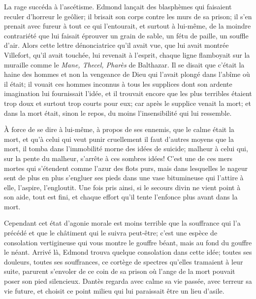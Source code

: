 La rage succéda à l'ascétisme. Edmond lançait des blasphèmes qui faisaient reculer d'horreur le geôlier; il brisait son corps contre les murs de sa prison; il s'en prenait avec fureur à tout ce qui l'entourait, et surtout à lui-même, de la moindre contrariété que lui faisait éprouver un grain de sable, un fétu de paille, un souffle d'air. Alors cette lettre dénonciatrice qu'il avait vue, que lui avait montrée Villefort, qu'il avait touchée, lui revenait à l'esprit, chaque ligne flamboyait sur la muraille comme le \textit{Mane, Thecel, Pharès} de Balthazar. Il se disait que c'était la haine des hommes et non la vengeance de Dieu qui l'avait plongé dans l'abîme où il était; il vouait ces hommes inconnus à tous les supplices dont son ardente imagination lui fournissait l'idée, et il trouvait encore que les plus terribles étaient trop doux et surtout trop courts pour eux; car après le supplice venait la mort; et dans la mort était, sinon le repos, du moins l'insensibilité qui lui ressemble.

À force de se dire à lui-même, à propos de ses ennemis, que le calme était la mort, et qu'à celui qui veut punir cruellement il faut d'autres moyens que la mort, il tomba dans l'immobilité morne des idées de suicide; malheur à celui qui, sur la pente du malheur, s'arrête à ces sombres idées! C'est une de ces mers mortes qui s'étendent comme l'azur des flots purs, mais dans lesquelles le nageur sent de plus en plus s'engluer ses pieds dans une vase bitumineuse qui l'attire à elle, l'aspire, l'engloutit. Une fois pris ainsi, si le secours divin ne vient point à son aide, tout est fini, et chaque effort qu'il tente l'enfonce plus avant dans la mort.

Cependant cet état d'agonie morale est moins terrible que la souffrance qui l'a précédé et que le châtiment qui le suivra peut-être; c'est une espèce de consolation vertigineuse qui vous montre le gouffre béant, mais au fond du gouffre le néant. Arrivé là, Edmond trouva quelque consolation dans cette idée; toutes ses douleurs, toutes ses souffrances, ce cortège de spectres qu'elles tramaient à leur suite, parurent s'envoler de ce coin de sa prison où l'ange de la mort pouvait poser son pied silencieux. Dantès regarda avec calme sa vie passée, avec terreur sa vie future, et choisit ce point milieu qui lui paraissait être un lieu d'asile.

